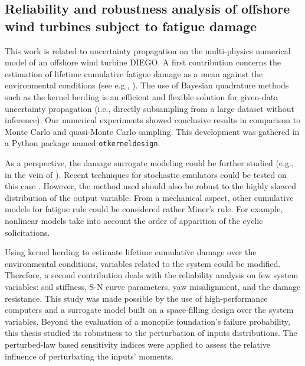 \subsection*{Reliability and robustness analysis of offshore wind turbines subject to fatigue damage}

This work is related to uncertainty propagation on the multi-physics numerical model of an offshore wind turbine DIEGO. 
A first contribution concerns the estimation of lifetime cumulative fatigue damage as a mean against the environmental conditions (see e.g., \citealp{muller_cheng_2018}). 
The use of Bayesian quadrature methods such as the kernel herding \citep{chen_welling_2010,husar_duvenaud_2012} is an efficient and flexible solution for given-data uncertainty propagation (i.e., directly subsampling from a large dataset without inference). 
Our numerical experiments showed conclusive results in comparison to Monte Carlo and quasi-Monte Carlo sampling. 
This development was gathered in a Python package named \texttt{otkerneldesign}. 

As a perspective, the damage surrogate modeling could be further studied (e.g., in the vein of \citealp{slot_sorensen_2020}). 
Recent techniques for stochastic emulators could be tested on this case \citep{baker_2022_stochastic_surrogates_review,zhu_2023_stochastic_pce,luthen_2023_stochastic_pce}.
However, the method used should also be robust to the highly skewed distribution of the output variable. 
From a mechanical aspect, other cumulative models for fatigue rule could be considered rather Miner's rule. 
For example, nonlinear models \citep{rocher_2020_nonlinear_fatigue} take into account the order of apparition of the cyclic solicitations.  

Using kernel herding to estimate lifetime cumulative damage over the environmental conditions, variables related to the system could be modified. 
Therefore, a second contribution deals with the reliability analysis on few system variables: soil stiffness, S-N curve parameters, yaw misalignment, and the damage resistance.   
This study was made possible by the use of high-performance computers and a surrogate model built on a space-filling design over the system variables. 
Beyond the evaluation of a monopile foundation's failure probability, this thesis studied its robustness to the perturbation of inputs distributions.  
The perturbed-law based sensitivity indices \citep{lemaitre_2015_PLI} were applied to assess the relative influence of perturbating the inputs' moments. 

